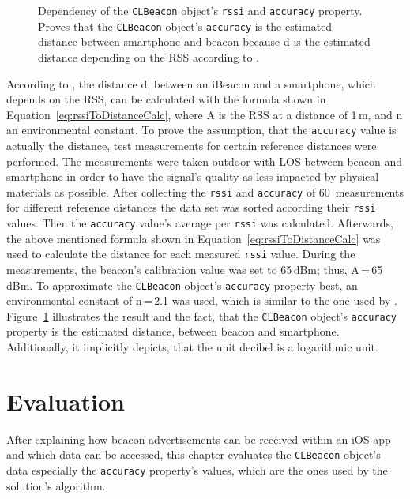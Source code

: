 \begin{figure}
  
	\caption{Dependency of the \texttt{CLBeacon} object's \texttt{rssi} and \texttt{accuracy} property. Proves that the \texttt{CLBeacon} object's \texttt{accuracy} is the estimated distance between smartphone and beacon because d is the estimated distance depending on the \ac{RSS} according to \citet{wang:bt_pos,kotanen:exp_local_pos_bt}.}
	\label{fig:eval_accuracy_vs_distance}
\end{figure}

According to \citet{wang:bt_pos}, the distance d, between an iBeacon and a smartphone, which depends on the \acl{RSS}, can be calculated with the formula shown in Equation~\ref{eq:rssiToDistanceCalc}, where A is the \acs{RSS} at a distance of 1\,m, and n an environmental constant. To prove the assumption, that the \texttt{accuracy} value is actually the distance, test measurements for certain reference distances were performed. The measurements were taken outdoor with \ac{LOS} between beacon and smartphone in order to have the signal's quality as less impacted by physical materials as possible. After collecting the \texttt{rssi} and \texttt{accuracy} of 60~measurements for different reference distances the data set was sorted according their \texttt{rssi} values. Then the \texttt{accuracy} value's average per \texttt{rssi} was calculated. Afterwards, the above mentioned formula shown in Equation~\ref{eq:rssiToDistanceCalc} was used to calculate the distance for each measured \texttt{rssi} value. During the measurements, the beacon's calibration value was set to 65\,dBm; thus, A\,=\,65\,dBm. To approximate the \texttt{CLBeacon} object's \texttt{accuracy} property best, an environmental constant of n\,=\,2.1 was used, which is similar to the one used by \citet{wang:bt_pos}.
Figure~\ref{fig:eval_accuracy_vs_distance} illustrates the result and the fact, that the \texttt{CLBeacon} object's \texttt{accuracy} property is the estimated distance, between beacon and smartphone. Additionally, it implicitly depicts, that the unit decibel is a logarithmic unit.


\section{Evaluation}\label{sec:beacon_eval}
After explaining how beacon advertisements can be received within an iOS app and which data can be accessed, this chapter evaluates the \texttt{CLBeacon} object's data especially the \texttt{accuracy} property's values, which are the ones used by the solution's algorithm.

